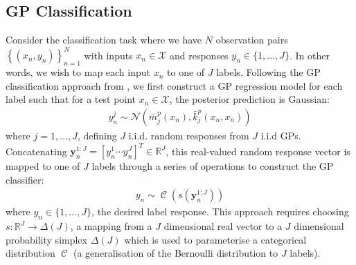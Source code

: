 \documentclass{article}
\newcommand{\Cat}{\operatorname{\mathcal{C}}}
\numberwithin{equation}{section}
\begin{document}
\subsection{GP Classification}
Consider the classification task where we have $N$ observation pairs $\left\{(x_n, y_n)\right\}_{n=1}^{N}$ with inputs $x_n \in \mathcal{X}$ and responses $y_n \in \{1, \dots, J\}$. In other words, we wish to map each input $x_n$ to one of $J$ labels. Following the GP classification approach from \cite{matthews2017scalable}, we first construct a GP regression model for each label such that for a test point $x_n \in \mathcal{X}$, the posterior prediction is Gaussian:
\begin{align}
    y_n^j \sim \mathcal{N}\left(\bar{m}^p_j(x_n), \bar{k}^p_j(x_n, x_n)\right)
    \label{gp-classifier-regressors}
\end{align}
where $j=1, \dots, J$, defining $J$ i.i.d. random responses from $J$ i.i.d GPs.
Concatenating $\mathbf{y}_n^{1:J} = [y_n^1 \cdots y_n^J]^T \in \mathbb{R}^{J}$, this real-valued random response vector is mapped to one of $J$ labels through a series of operations to construct the GP classifier:
\begin{align}
y_n \sim \Cat \left(s\left(\mathbf{y}_n^{1:J}\right)\right)
\label{gp-classifier}
\end{align}
where $y_n \in \{1, \dots, J\}$, the desired label response. This approach requires choosing $s: \mathbb{R}^J \rightarrow \Delta(J)$, a mapping from a $J$ dimensional real vector to a $J$ dimensional probability simplex $\Delta(J)$ which is used to parameterise a categorical distribution $\Cat$ (a generalisation of the Bernoulli distribution to $J$ labels).
\end{document}
